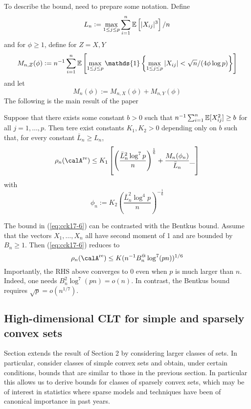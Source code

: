 To describe the bound, need to prepare some notation. Define 
\[L_n := \max_{1\leq j \leq p} \sum_{i=1}^n \mathbb{E}\left[|X_{ij}|^3\right]/n\]
and for $\phi \geq 1$, define for $Z = X,Y$
\begin{equation}
	\label{eq:cck17-5}
	M_{n,Z}(\phi) := n^{-1}\sum_{i=1}^n \E\left[\max_{1\leq j \leq p}\mathds{1}\left\{\max_{1\leq j \leq p} |X_{ij}| < \sqrt{n}/(4\phi\log p)\right\}\right]
\end{equation}
and let 
\[M_n(\phi) := M_{n,X}(\phi) + M_{n,Y}(\phi)\]
The following is the main result of the paper 
\begin{theorem}
	\label{thm:ckk17-1}
	Suppose that there exists some constant $b > 0$ such that $n^{-1}\sum_{i=1}^n \mathbb{E}[X_{ij}^2] \geq b$ for all $j = 1, \dots, p$. Then tere exist constants $K_1, K_2 > 0$ depending only on $b$ such that, for every constant $\bar{L}_n \geq L_n$,
	\begin{equation}
		\label{eq:cck17-6}
		\rho_n(\calA^{\text{re}}) \leq K_1 \left[\left(\frac{\bar{L}^2_n\log^7 p}{n}\right)^{\frac{1}{6}} + \frac{M_n(\phi_n)}{\bar{L}_n}\_\right]
	\end{equation}
	with 
	\begin{equation}
		\label{eq:cck17-7}
		\phi_n := K_2\left(\frac{\bar{L}_n^2 \log^4 p}{n} \right)^{-\frac{1}{6}}
	\end{equation}
\end{theorem}

\begin{remark}
	The bound in (\ref{eq:cck17-6}) can be contrasted with the Bentkus bound. Assume that the vectors $X_1, \dots, X_n$ all have second moment of 1 and are bounded by $B_n \geq 1$. Then (\ref{eq:cck17-6}) reduces to 
	\begin{equation}
		\label{eq:cck17-8}
		\rho_n(\calA^{\text{re}})\leq K(n^{-1}B_n^@\log^7(pn))^{1/6}
	\end{equation}
	Importantly, the RHS above converges to 0 even when $p$ is much larger than $n$. Indeed, one needs $B_n^2\log^7(pn)= o(n)$. In contrast, the Bentkus bound requires $\sqrt{p} = o(n^{1/7})$.
\end{remark}

\subsection{High-dimensional CLT for simple and sparsely convex sets}
Section extends the result of Section 2 by considering larger classes of sets. In particular, consider classes of simple convex sets and obtain, under certain conditions, bounds that are similar to those in the previous section. In particular this allows us to derive bounds for classes of sparsely convex sets, which may be of interest in statistics where sparse models and techniques have been of canonical importance in past years. 

